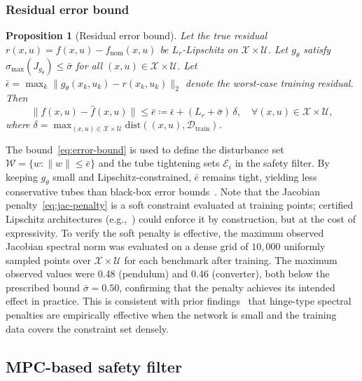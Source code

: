 \documentclass[12pt,a4paper]{article}
\newtheorem{proposition}{Proposition}
\begin{document}
\subsubsection{Residual error bound}
\label{subsubsec:error-bound}

\begin{proposition}[Residual error bound]
\label{prop:error-bound}
Let the true residual $r(x,u) = f(x,u) - f_{\mathrm{nom}}(x,u)$ be
$L_r$-Lipschitz on $\mathcal{X} \times \mathcal{U}$. Let $g_\theta$
satisfy $\sigma_{\max}(J_{g_\theta}) \leq \bar\sigma$ for all
$(x,u) \in \mathcal{X} \times \mathcal{U}$. Let
$\bar\epsilon = \max_k \|g_\theta(x_k,u_k) - r(x_k,u_k)\|_2$
denote the worst-case training residual. Then
\begin{equation}
  \|f(x,u) - \hat{f}(x,u)\| \leq \bar{e} \coloneqq
  \bar\epsilon + (L_r + \bar\sigma)\,\delta,
  \quad \forall (x,u) \in \mathcal{X}\times\mathcal{U},
  \label{eq:error-bound}
\end{equation}
where $\delta = \max_{(x,u)\in\mathcal{X}\times\mathcal{U}}
\mathrm{dist}((x,u), \mathcal{D}_{\mathrm{train}})$.
\end{proposition}

\noindent
The bound~\eqref{eq:error-bound} is used to define the disturbance set
$\mathcal{W} = \{w : \|w\| \leq \bar{e}\}$ and the tube tightening
sets $\mathcal{E}_i$ in the safety filter. By keeping $g_\theta$ small
and Lipschitz-constrained, $\bar{e}$ remains tight, yielding less
conservative tubes than black-box error
bounds~\cite{gao2024rigid,koller2022learning}. Note that the Jacobian
penalty~\eqref{eq:jac-penalty} is a soft constraint evaluated at
training points; certified Lipschitz architectures
(e.g.,~\cite{liu2022monotone}) could enforce it by construction, but
at the cost of expressivity. To verify the soft penalty is effective,
the maximum observed Jacobian spectral norm was evaluated on a dense
grid of $10{,}000$ uniformly sampled points over
$\mathcal{X} \times \mathcal{U}$ for each benchmark after training. The
maximum observed values were 0.48 (pendulum) and 0.46 (converter),
both below the prescribed bound $\bar\sigma = 0.50$, confirming that
the penalty achieves its intended effect in practice. This is consistent
with prior findings~\cite{liu2022monotone} that hinge-type
spectral penalties are empirically effective when the network is small
and the training data covers the constraint set densely.

\subsection{MPC-based safety filter}
\label{subsec:safety-filter}
\end{document}
